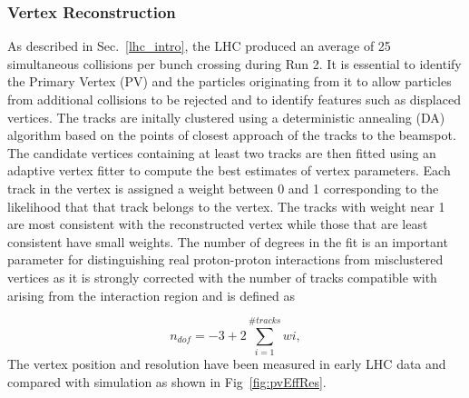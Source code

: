 \subsubsection{Vertex Reconstruction}

As described in Sec.~\ref{lhc_intro}, the LHC produced an average of 25 simultaneous collisions per bunch crossing
during Run 2. It is essential to identify the Primary Vertex (PV) and the particles originating from it to allow 
particles from additional collisions to be rejected and to identify features such as displaced vertices. The tracks
are initally clustered using a deterministic annealing (DA) algorithm based on the points of closest approach of the 
tracks to the beamspot\cite{tracker_vertex}. The candidate vertices containing at least two tracks are then
fitted using an adaptive vertex fitter to compute the best estimates of vertex parameters\cite{tracker_avf}. 
Each track in the vertex is assigned a weight between 0 and 1 corresponding to the likelihood that that track
belongs to the vertex. The tracks with weight near 1 are most consistent with the reconstructed vertex while
those that are least consistent have small weights. The number of degrees in the fit is an important parameter
for distinguishing real proton-proton interactions from misclustered vertices as it is strongly corrected with
the number of tracks compatible with arising from the interaction region\cite{tracker_vertex} and is defined 
as

\begin{equation}
n_{dof} = -3 + 2 \sum_{i=1}^{\#tracks} wi,
\end{equation}
The vertex position and resolution have been measured in early LHC data and compared with simulation as shown in 
Fig~\ref{fig:pvEffRes}.

